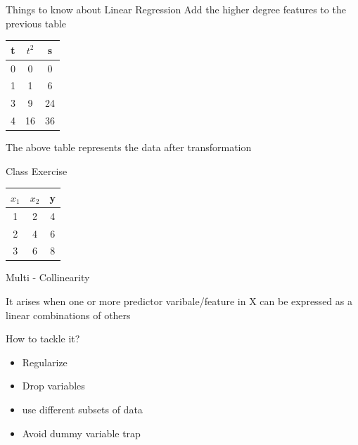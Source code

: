 \documentclass{beamer}
\begin{document}
\begin{frame}{Things to know about Linear Regression}
Add the higher degree features to the previous table
    
       
    \begin{center}
 \begin{tabular}{||c c c||} 
 \hline
 t  & $t^{2}$ & s \\ [0.5ex] 
 \hline\hline
 0 & 0&0 \\
 1 & 1&6 \\
 3 & 9&24 \\
 4 & 16&36 \\
 \hline
\end{tabular}
\end{center}

The above table represents the data after transformation
\end{frame}


\begin{frame}{Class Exercise}
    
    \begin{center}
         \begin{tabular}{||c c | c||} 
         \hline
         $x_{1}$  & $x_{2}$ & y  \\ [0.5ex] 
         \hline\hline
         1 & 2 & 4 \\
         2 & 4 & 6\\
         3 & 6 & 8\\
         \hline
        \end{tabular}
    \end{center}
\end{frame}




\begin{frame}{Multi - Collinearity}

It arises when one or more predictor varibale/feature in X can be expressed as a linear combinations of others\\
\vspace{5mm}



How to tackle it?
\begin{itemize}
    \item<+-> Regularize
    \item<+-> Drop variables
    \item<+-> use different subsets of data
    \item<+-> Avoid dummy variable trap
\end{itemize}
\end{frame}
\end{document}
